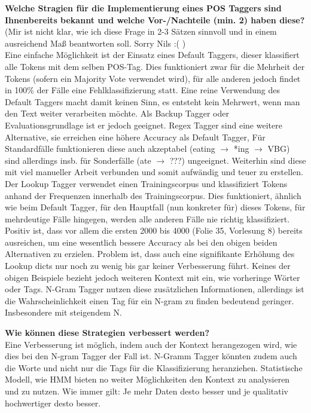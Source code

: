 \documentclass[12pt]{article}
\begin{document}
    \noindent\textbf{Welche Stragien für die Implementierung eines POS Taggers sind Ihnenbereits bekannt und welche Vor-/Nachteile (min. 2) haben diese?}\\
    (Mir ist nicht klar, wie ich diese Frage in 2-3 Sätzen sinnvoll und in einem ausreichend Maß beantworten soll. Sorry Nils :( )\\
    Eine einfache Möglichkeit ist der Einsatz eines Default Taggers, dieser klassifiert alle Tokens mit dem selben POS-Tag.
    Dies funktioniert zwar für die Mehrheit der Tokens (sofern ein Majority Vote verwendet wird), für alle anderen jedoch findet in 100\% der Fälle eine Fehlklassifizierung statt.
    Eine reine Verwendung des Default Taggers macht damit keinen Sinn, es entsteht kein Mehrwert, wenn man den Text weiter verarbeiten möchte.
    Als Backup Tagger oder Evaluationsgrundlage ist er jedoch geeignet.
    Regex Tagger sind eine weitere Alternative, sie erreichen eine höhere Accuracy als Default Tagger,
    Für Standardfälle funktionieren diese auch akzeptabel (eating $\rightarrow$ *ing $\rightarrow$ VBG) sind allerdings insb. für Sonderfälle (ate $\rightarrow$ ???) ungeeignet.
    Weiterhin sind diese mit viel manueller Arbeit verbunden und somit aufwändig und teuer zu erstellen.
    Der Lookup Tagger verwendet einen Trainingscorpus und klassifiziert Tokens anhand der Frequenzen innerhalb des Trainingscorpus.
    Dies funktioniert, ähnlich wie beim Default Tagger, für den Hauptfall (nun konkreter für) dieses Tokens, für mehrdeutige Fälle hingegen, werden alle anderen Fälle nie richtig klassifiziert.
    Positiv ist, dass vor allem die ersten 2000 bis 4000 (Folie 35, Vorlesung 8) bereits ausreichen, um eine wesentlich bessere Accuracy als bei den obigen beiden Alternativen zu erzielen.
    Problem ist, dass auch eine signifikante Erhöhung des Lookup dicts nur noch zu wenig bis gar keiner Verbesserung führt.
    Keines der obigen Beispiele bezieht jedoch weiteren Kontext mit ein, wie vorheringe Wörter oder Tags.
    N-Gram Tagger nutzen diese zusätzlichen Informationen, allerdings ist die Wahrscheinlichkeit einen Tag für ein N-gram zu finden bedeutend geringer.
    Insbesondere mit steigendem N.

    \noindent\textbf{Wie können diese Strategien verbessert werden?}\\
    Eine Verbesserung ist möglich, indem auch der Kontext herangezogen wird, wie dies bei den N-gram Tagger der Fall ist.
    N-Gramm Tagger könnten zudem auch die Worte und nicht nur die Tags für die Klassifizierung heranziehen.
    Statistische Modell, wie HMM bieten no weiter Möglichkeiten den Kontext zu analysieren und zu nutzen.
    Wie immer gilt: Je mehr Daten desto besser und je qualitativ hochwertiger desto besser.
\end{document}
